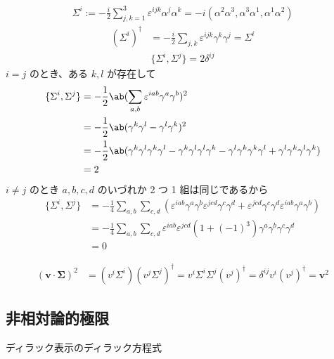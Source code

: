 \documentclass[uplatex,dvipdfmx,a4paper,11pt]{jlreq}
\theoremstyle{definition}
\numberwithin{equation}{section}
\begin{document}
\begin{align}
  \Sigma^i := -\frac{i}{2}\sum_{j,k = 1}^{3}\varepsilon^{ijk}\alpha^j\alpha^k = -i(\alpha^2\alpha^3, \alpha^3\alpha^1, \alpha^1\alpha^2)
\end{align}
\begin{align}
  (\Sigma^i)^\dagger & = -\frac{i}{2}\sum_{j,k}\varepsilon^{ijk}\gamma^k\gamma^j = \Sigma^i
\end{align}
\begin{align}
  \lbrace\Sigma^i, \Sigma^j\rbrace = 2\delta^{ij}
\end{align}
$i = j$ のとき、ある $k, l$ が存在して
\begin{align}
  \lbrace\Sigma^i, \Sigma^j\rbrace & = -\frac{1}{2}\ab(\sum_{a,b}\varepsilon^{iab}\gamma^a\gamma^b)^2                                                                                             \\
                                   & = -\frac{1}{2}\ab(\gamma^k\gamma^l - \gamma^l\gamma^k)^2                                                                                                     \\
                                   & = -\frac{1}{2}\ab(\gamma^k\gamma^l\gamma^k\gamma^l - \gamma^k\gamma^l\gamma^l\gamma^k - \gamma^l\gamma^k\gamma^k\gamma^l + \gamma^l\gamma^k\gamma^l\gamma^k) \\
                                   & = 2
\end{align}
$i \neq j$ のとき $a, b, c, d$ のいづれか 2 つ 1 組は同じであるから
\begin{align}
  \lbrace\Sigma^i, \Sigma^j\rbrace & = -\frac{1}{4}\sum_{a,b}\sum_{c,d}(\varepsilon^{iab}\gamma^a\gamma^b\varepsilon^{jcd}\gamma^c\gamma^d + \varepsilon^{jcd}\gamma^c\gamma^d\varepsilon^{iab}\gamma^a\gamma^b) \\
                                   & = -\frac{1}{4}\sum_{a,b}\sum_{c,d}\varepsilon^{iab}\varepsilon^{jcd}(1 + (-1)^3)\gamma^a\gamma^b\gamma^c\gamma^d                                                            \\
                                   & = 0
\end{align}

\begin{align}
  (\bm{v}\cdot\bm{\Sigma})^2 & = (v^i\Sigma^i)(v^j\Sigma^j)^\dagger = v^i\Sigma^i\Sigma^j(v^j)^\dagger = \delta^{ij}v^i(v^j)^\dagger = \bm{v}^2
\end{align}

\subsection{非相対論的極限}
ディラック表示のディラック方程式
\end{document}
